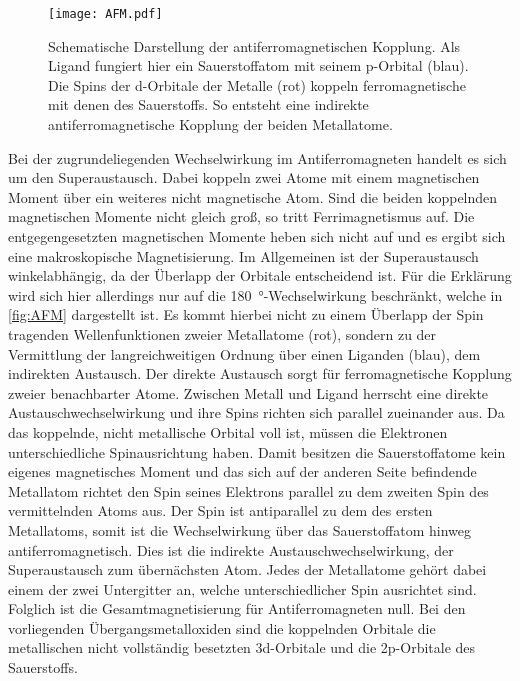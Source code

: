         \begin{figure}
            \centering
            \texttt{[image: AFM.pdf]}
            \caption{Schematische Darstellung der antiferromagnetischen Kopplung.
            Als Ligand fungiert hier ein Sauerstoffatom mit seinem p-Orbital (blau).
            Die Spins der d-Orbitale der Metalle (rot) koppeln ferromagnetische mit denen des Sauerstoffs.
            So entsteht eine indirekte antiferromagnetische Kopplung der beiden Metallatome.}
            \label{fig:AFM}
        \end{figure}
        Bei der zugrundeliegenden Wechselwirkung im Antiferromagneten handelt es sich um den Superaustausch.
        Dabei koppeln zwei Atome mit einem magnetischen Moment über ein weiteres nicht magnetische Atom. 
        Sind die beiden koppelnden magnetischen Momente nicht gleich groß, so tritt Ferrimagnetismus auf.
        Die entgegengesetzten magnetischen Momente heben sich nicht auf und es ergibt sich eine makroskopische Magnetisierung.
        Im Allgemeinen ist der Superaustausch winkelabhängig, da der Überlapp der Orbitale entscheidend ist.
        Für die Erklärung wird sich hier allerdings nur auf die \SI{180}{\degree}-Wechselwirkung beschränkt, welche in \autoref{fig:AFM} dargestellt ist.
        Es kommt hierbei nicht zu einem Überlapp der Spin tragenden Wellenfunktionen zweier Metallatome (rot), sondern zu der Vermittlung der langreichweitigen Ordnung über einen Liganden (blau), dem indirekten Austausch.
        Der direkte Austausch sorgt für ferromagnetische Kopplung zweier benachbarter Atome.
        Zwischen Metall und Ligand herrscht eine direkte Austauschwechselwirkung und ihre Spins richten sich parallel zueinander aus.
        Da das koppelnde, nicht metallische Orbital voll ist, müssen die Elektronen unterschiedliche Spinausrichtung haben.
        Damit besitzen die Sauerstoffatome kein eigenes magnetisches Moment und das sich auf der anderen Seite befindende Metallatom richtet den Spin seines Elektrons parallel zu dem zweiten Spin des vermittelnden Atoms aus.
        Der Spin ist antiparallel zu dem des ersten Metallatoms, somit ist die Wechselwirkung über das Sauerstoffatom hinweg antiferromagnetisch. 
        Dies ist die indirekte Austauschwechselwirkung, der Superaustausch zum übernächsten Atom.
        Jedes der Metallatome gehört dabei einem der zwei Untergitter an, welche unterschiedlicher Spin ausrichtet sind.
        Folglich ist die Gesamtmagnetisierung für Antiferromagneten null.
        Bei den vorliegenden Übergangsmetalloxiden sind die koppelnden Orbitale die metallischen nicht vollständig besetzten 3d-Orbitale und die 2p-Orbitale des Sauerstoffs.
        
